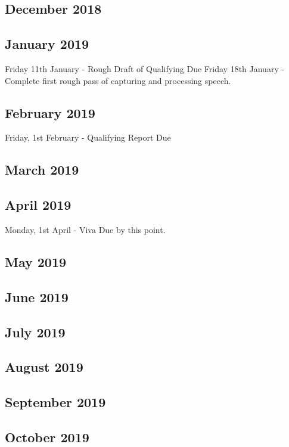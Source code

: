 \documentclass{article}
\begin{document}
	\subsection{December 2018}	
	
	\subsection{January 2019}
	Friday 11th January - Rough Draft of Qualifying Due
	Friday 18th January - Complete first rough pass of capturing and processing speech.
	
	\subsection{February 2019}
	Friday, 1st February - Qualifying Report Due
	
	\subsection{March 2019}
	
	\subsection{April 2019}
	Monday, 1st April - Viva Due by this point.
	\subsection{May 2019}
	
	\subsection{June 2019}
	
	\subsection{July 2019}
	
	\subsection{August 2019}
	
	\subsection{September 2019}
	
	\subsection{October 2019}
	
\end{document}
